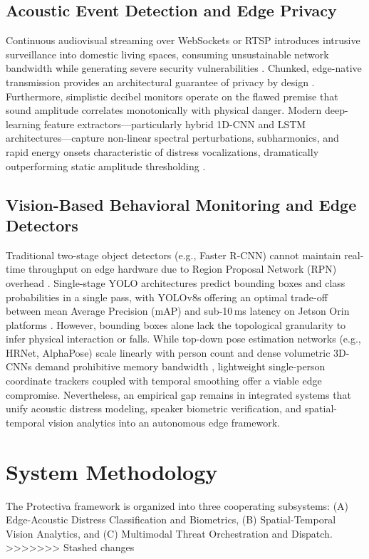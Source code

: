 \documentclass[conference]{IEEEtran}
\begin{document}
\subsection{Acoustic Event Detection and Edge Privacy}
Continuous audiovisual streaming over WebSockets or RTSP introduces intrusive surveillance into domestic living spaces, consuming unsustainable network bandwidth while generating severe security vulnerabilities \cite{b1}. Chunked, edge-native transmission provides an architectural guarantee of privacy by design \cite{b2}. Furthermore, simplistic decibel monitors operate on the flawed premise that sound amplitude correlates monotonically with physical danger. Modern deep-learning feature extractors---particularly hybrid 1D-CNN and LSTM architectures---capture non-linear spectral perturbations, subharmonics, and rapid energy onsets characteristic of distress vocalizations, dramatically outperforming static amplitude thresholding \cite{b3, b7, b8}.

\subsection{Vision-Based Behavioral Monitoring and Edge Detectors}
Traditional two-stage object detectors (e.g., Faster R-CNN) cannot maintain real-time throughput on edge hardware due to Region Proposal Network (RPN) overhead \cite{b11}. Single-stage YOLO architectures predict bounding boxes and class probabilities in a single pass, with YOLOv8s offering an optimal trade-off between mean Average Precision (mAP) and sub-10\,ms latency on Jetson Orin platforms \cite{b11}. However, bounding boxes alone lack the topological granularity to infer physical interaction or falls. While top-down pose estimation networks (e.g., HRNet, AlphaPose) scale linearly with person count \cite{b12} and dense volumetric 3D-CNNs demand prohibitive memory bandwidth \cite{b14}, lightweight single-person coordinate trackers coupled with temporal smoothing offer a viable edge compromise. Nevertheless, an empirical gap remains in integrated systems that unify acoustic distress modeling, speaker biometric verification, and spatial-temporal vision analytics into an autonomous edge framework.

\section{System Methodology}
The Protectiva framework is organized into three cooperating subsystems: (A) Edge-Acoustic Distress Classification and Biometrics, (B) Spatial-Temporal Vision Analytics, and (C) Multimodal Threat Orchestration and Dispatch.
>>>>>>> Stashed changes
\end{document}
